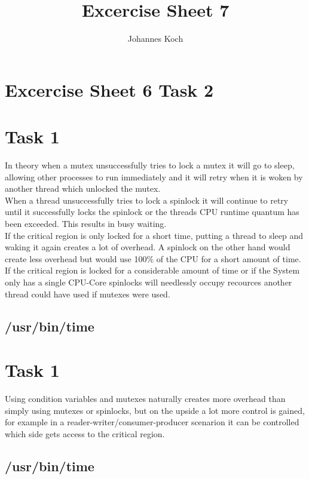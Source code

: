 \documentclass[11pt]{article} %
\title{Excercise Sheet 7}
\author{Johannes Koch}
\begin{document}
\maketitle

\section{Excercise Sheet 6 Task 2}


\section{Task 1}
In theory when a mutex unsuccessfully tries to lock a mutex it will go to sleep, allowing other processes to run
immediately and it will retry when it is woken by another thread which unlocked the mutex.\\
When a thread unsuccessfully tries to lock a spinlock it will continue to retry until it successfully locks the spinlock
or the threads CPU runtime quantum has been exceeded. This results in busy waiting.\\
If the critical region is only locked for a short time, putting a thread to sleep and waking it again creates a lot
of overhead. A spinlock on the other hand would create less overhead but would use 100\% of the CPU for a short amount of time.
If the critical region is locked for a considerable amount of time or if the System only has a single CPU-Core spinlocks will needlessly
occupy recources another thread could have used if mutexes were used.



\subsection{/usr/bin/time}


\section{Task 1}
Using condition variables and mutexes naturally creates more overhead than simply using mutexes or spinlocks, but
on the upside a lot more control is gained, for example in a reader-writer/consumer-producer scenarion it can be controlled
which side gets access to the critical region.



\subsection{/usr/bin/time}
\end{document}
